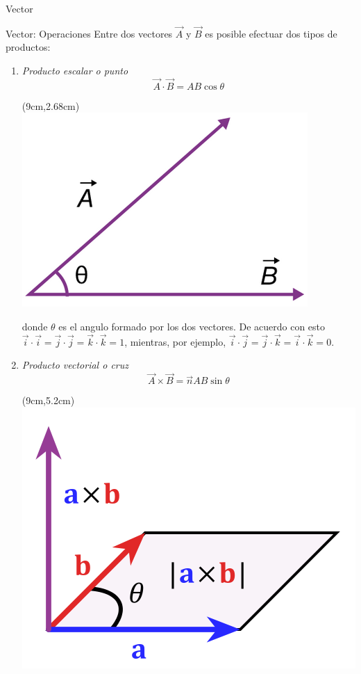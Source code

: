 \documentclass [xcolor=svgnames, t] {beamer}
\begin{document}
\begin{frame}{Vector}
\vspace{-0.5cm}
\begin{block}{Vector: Operaciones}
Entre dos vectores $\vec{A}$ y $\vec{B}$ es posible efectuar dos tipos de productos:
\begin{enumerate}
\item \emph{Producto escalar o punto}
\vspace{0.3cm}
$$
\vec{A}\cdot \vec{B} = AB \cos \theta
$$
\begin{textblock*}{3cm}(9cm,2.68cm) %
\includegraphics[width=\textwidth]{pes}
\end{textblock*}
donde $\theta$ es el angulo formado por los dos vectores. De acuerdo con esto $\vec{i} \cdot \vec{i} = \vec{j} \cdot \vec{j}= \vec{k} \cdot \vec{k} = 1$, mientras, por ejemplo, $\vec{i} \cdot \vec{j} = \vec{j} \cdot \vec{k} =\vec{i} \cdot \vec{k} = 0$.
\item \emph{Producto vectorial o cruz}
$$
\vec{A} \times \vec{B} = \vec{n}AB \sin \theta
$$
\begin{textblock*}{3cm}(9cm,5.2cm) %
\includegraphics[width=\textwidth]{crop}

\end{textblock*}
\end{enumerate}
\end{block}
\end{frame}
\end{document}
